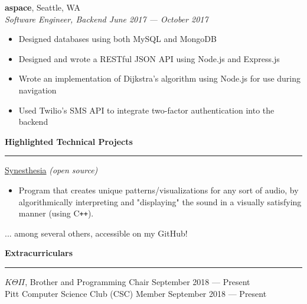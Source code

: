 \documentclass[11pt]{article}
\begin{document}
\begin{flushleft}
		\textbf{aspace}, Seattle, WA\\
		\textit{\small Software Engineer, Backend \hfill June 2017 --- October 2017}
		\vspace{-1.25mm}
		\begin{itemize}
			\item Designed databases using both MySQL and MongoDB
			\vspace{-1.5mm}
			\item Designed and wrote a RESTful JSON API using Node.js and Express.js
			\vspace{-1.5mm}
			\item Wrote an implementation of Dijkstra's algorithm using Node.js for use during navigation
			\vspace{-1.5mm}
			\item Used Twilio's SMS API to integrate two-factor authentication into the backend
		\end{itemize}
		
		\vspace{1.35mm}
		{\large \raggedright \textbf{Highlighted Technical Projects}}
		\vspace{1.25mm}
	
		\hrule
	
		\vspace{2.25mm}
		\href{https://github.com/avigloz/synesthesia}{Synesthesia} \textit{(open source)}
		\vspace{-1.25mm}
		\begin{itemize}
			\item Program that creates unique patterns/visualizations for any sort of audio, by algorithmically interpreting and "displaying" the sound in a visually satisfying manner (using C\texttt{++}).
		\end{itemize}

		... among several others, accessible on my GitHub!

		\vspace{1.35mm}
		{\large \raggedright \textbf{Extracurriculars}}
		\vspace{1.25mm}
	
		\hrule
	
		\vspace{2.25mm}
		$K\Theta\Pi$, Brother and Programming Chair \hfill September 2018 --- Present\\
		Pitt Computer Science Club (CSC) Member \hfill September 2018 --- Present
	\end{flushleft}
\end{document}
